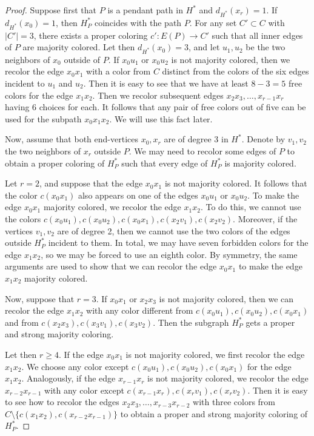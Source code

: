 \documentclass[11pt]{article}
\begin{document}
\begin{proof}
Suppose first that $P$ is a pendant path in $H^*$ and $d_{H^*}(x_r)=1$. If $d_{H^*}(x_0)=1$, then $H^*_P$ coincides with the path $P$. For any set $C'\subset C$ with $|C'|=3$, there exists a proper coloring $c':E(P)\rightarrow C'$ such that all  inner edges of $P$ are majority colored. 
Let then $d_{H^*}(x_0)=3$, and let $u_1,u_2$ be the two neighbors of $x_0$ outside of $P$. If $x_0u_1$ or $x_0u_2$ is not majority colored, then we recolor the edge $x_0x_1$ with a color from $C$ distinct from the colors of the six edges incident to $u_1$ and $u_2$. Then it is easy to see that we have at least $8-3=5$ free colors for the edge $x_1x_2$. Then we recolor subsequent edges $x_2x_3,\ldots, x_{r-1}x_r$ having 6 choices for each. It follows that any pair of free colors out of five can be used for the subpath $x_0x_1x_2$. We will use this fact later.

Now, assume that both end-vertices $x_0,x_r$ are of degree 3 in $H^*$. Denote by $v_1,v_2$ the two neighbors of $x_r$ outside $P$. We may need to recolor some edges of $P$ to obtain a proper coloring of $H^*_P$
such that every edge of $H^*_P$ is majority colored. 

Let $r=2$, and suppose that the edge $x_0x_1$ is not majority colored. It follows that the color $c(x_0x_1)$ also appears on one of the edges $x_0u_1$ or $x_0u_2$. To make the edge $x_0x_1$ majority colored, we recolor the edge $x_1x_2$. To do this, we cannot use the colors $c(x_0u_1), c(x_0u_2), c(x_0x_1),c(x_2v_1), c(x_2v_2)$. Moreover, if the vertices $v_1,v_2$ are of degree 2, then we cannot use the two colors of the edges outside $H^*_P$ incident to them. In total, we may have seven forbidden colors for the edge $x_1x_2$, so we may be forced to use an eighth color. By symmetry, the same arguments are used to show that we can recolor the edge $x_0x_1$ to make the edge $x_1x_2$ majority colored. 

Now, suppose that $r= 3$. If  $x_0x_1$ or $x_2x_3$ is not majority colored, then we can recolor the edge $x_1x_2$ with any color different from $c(x_0u_1), c(x_0u_2), c(x_0x_1)$ and from $c(x_2x_3),c(x_3v_1),c(x_3v_2)$. Then the subgraph $H^*_P$ gets a proper and strong majority coloring.  

Let then $r\ge 4$. If the edge $x_0x_1$ is not majority colored, we first recolor the edge $x_1x_2$. We choose  any color except $c(x_0u_1), c(x_0u_2), c(x_0x_1)$ for the edge $x_1x_2$. Analogously, if the edge $x_{r-1}x_r$ is not majority colored, we recolor the edge $x_{r-2}x_{r-1}$ with any color except  $c(x_{r-1}x_r),c(x_rv_1), c(x_rv_2)$. Then it is easy to see how to recolor the edges $x_2x_3,\ldots,x_{r-3}x_{r-2}$ with three colors from $C\setminus\{c(x_1x_2),c(x_{r-2}x_{r-1})\}$ to obtain a proper and strong majority coloring of $H^*_P$. 


\end{proof}
\end{document}
